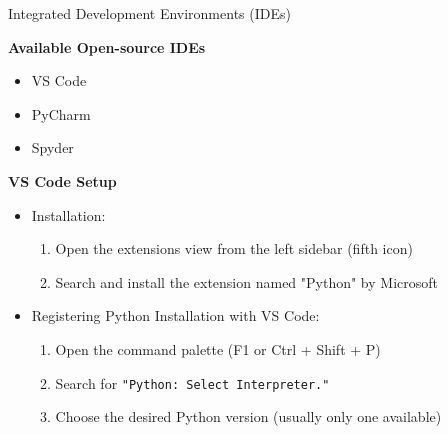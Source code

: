 \documentclass[
	11pt, 
]{beamer}
\begin{document}
\begin{frame}{Integrated Development Environments (IDEs)}
\begin{exampleblock}{\textbf{Available Open-source IDEs}}
\begin{itemize}
    \item VS Code 

    \item PyCharm

    \item Spyder
\end{itemize}
\end{exampleblock}\bigskip

\textbf{VS Code Setup}

\begin{itemize}
    \item Installation:
    \begin{enumerate}
        \item  Open the extensions view from the left sidebar (fifth icon)
        \item Search and install the extension named "Python" by Microsoft
    \end{enumerate} \bigskip
    
    \item Registering Python Installation with VS Code:
    \begin{enumerate}
        \item Open the command palette (F1 or Ctrl + Shift + P)
        \item Search for \texttt{"Python: Select Interpreter."}
        \item Choose the desired Python version (usually only one available)
     \end{enumerate}

     
\end{itemize}

\end{frame}

\end{document}
